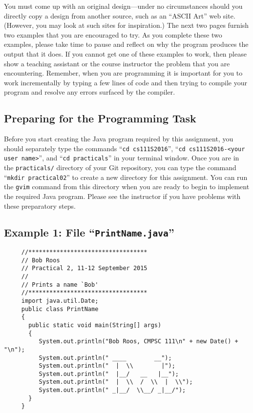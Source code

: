 You must come up with an original design---under no circumstances should you directly copy a design from another source,
such as an ``ASCII Art'' web site. (However, you may look at such sites for inspiration.) The next two pages furnish two
examples that you are encouraged to try. As you complete these two examples, please take time to pause and reflect on
why the program produces the output that it does.  If you cannot get one of these examples to work, then please show a
teaching assistant or the course instructor the problem that you are encountering. Remember, when you are programming it
is important for you to work incrementally by typing a few lines of code and then trying to compile your program and
resolve any errors surfaced by the compiler.

\subsection*{Preparing for the Programming Task}

Before you start creating the Java program required by this assignment, you should separately type the commands ``{\tt cd
  cs111S2016}'', ``{\tt cd cs111S2016-<your user name>}'', and ``{\tt cd practicals}'' in your terminal window. Once you
are in the {\tt practicals/} directory of your Git repository, you can type the command ``{\tt mkdir practical02}'' to
create a new directory for this assignment. You can run the {\tt gvim} command from this directory when you are ready to
begin to implement the required Java program. Please see the instructor if you have problems with these preparatory steps.


\subsection*{Example 1: File ``{\tt PrintName.java}''}
\begin{verbatim}
     //**********************************
     // Bob Roos
     // Practical 2, 11-12 September 2015
     //
     // Prints a name `Bob'
     //**********************************
     import java.util.Date;
     public class PrintName
     {
       public static void main(String[] args)
       {
          System.out.println("Bob Roos, CMPSC 111\n" + new Date() + "\n");
          System.out.println(" ____        __");
          System.out.println("  |  \\        |");
          System.out.println("  |__/   __   |__");
          System.out.println("  |  \\  /  \\  |  \\");
          System.out.println(" _|__/  \\__/ _|__/");
       }
     }
\end{verbatim}

